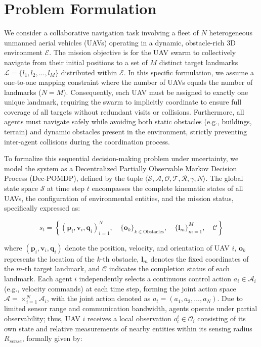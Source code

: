 \documentclass[conference]{IEEEtran}
\begin{document}
\section{Problem Formulation}
We consider a collaborative navigation task involving a fleet of $N$ heterogeneous unmanned aerial vehicles (UAVs) operating in a dynamic, obstacle-rich 3D environment $\mathcal{E}$. The mission objective is for the UAV swarm to collectively navigate from their initial positions to a set of $M$ distinct target landmarks $\mathcal{L} = \{l_1, l_2, \dots, l_M\}$ distributed within $\mathcal{E}$. In this specific formulation, we assume a one-to-one mapping constraint where the number of UAVs equals the number of landmarks ($N = M$). Consequently, each UAV must be assigned to exactly one unique landmark, requiring the swarm to implicitly coordinate to ensure full coverage of all targets without redundant visits or collisions. Furthermore, all agents must navigate safely while avoiding both static obstacles (e.g., buildings, terrain) and dynamic obstacles present in the environment, strictly preventing inter-agent collisions during the coordination process.

To formalize this sequential decision-making problem under uncertainty, we model the system as a Decentralized Partially Observable Markov Decision Process (Dec-POMDP), defined by the tuple $\langle \mathcal{S}, \mathcal{A}, \mathcal{O}, \mathcal{T}, \mathcal{R}, \gamma, N \rangle$. The global state space $\mathcal{S}$ at time step $t$ encompasses the complete kinematic states of all UAVs, the configuration of environmental entities, and the mission status, specifically expressed as:

$$ s_t = \left\{ (\mathbf{p}_i, \mathbf{v}_i, \mathbf{q}_i)_{i=1}^N, \quad \{\mathbf{o}_k\}_{k \in \text{Obstacles}}, \quad \{\mathbf{l}_m\}_{m=1}^M, \quad \mathcal{C} \right\} $$

where $(\mathbf{p}_i, \mathbf{v}_i, \mathbf{q}_i)$ denote the position, velocity, and orientation of UAV $i$, $\mathbf{o}_k$ represents the location of the $k$-th obstacle, $\mathbf{l}_m$ denotes the fixed coordinates of the $m$-th target landmark, and $\mathcal{C}$ indicates the completion status of each landmark. Each agent $i$ independently selects a continuous control action $a_i \in \mathcal{A}_i$ (e.g., velocity commands) at each time step, forming the joint action space $\mathcal{A} = \times_{i=1}^N \mathcal{A}_i$, with the joint action denoted as $a_t = (a_1, a_2, \dots, a_N)$. Due to limited sensor range and communication bandwidth, agents operate under partial observability; thus, UAV $i$ receives a local observation $o_t^i \in \mathcal{O}_i$ consisting of its own state and relative measurements of nearby entities within its sensing radius $R_{sense}$, formally given by:
\end{document}
